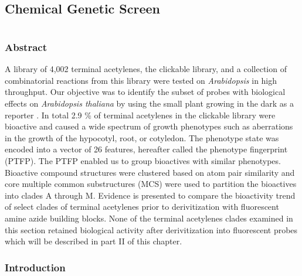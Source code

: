\chapter{Chemical Genetic Screen}

\part{}

\section{Abstract}

A library of 4,002 terminal acetylenes, the clickable library, and a collection of combinatorial reactions from this library were tested on {\it Arabidopsis} in high throughput. Our objective was to identify the subset of probes with biological effects on {\it Arabidopsis thaliana} by using the small plant growing in the dark as a reporter \cite{pennacchio2005arabidopsis,tojo2006simple}. In total 2.9 {\%} of terminal acetylenes in the clickable library were bioactive and caused a wide spectrum of growth phenotypes such as aberrations in the growth of the hypocotyl, root, or cotyledon. The phenotype state was encoded into a vector of 26 features, hereafter called the phenotype fingerprint (PTFP). The PTFP enabled us to group bioactives with similar phenotypes. Bioactive compound structures were clustered based on atom pair similarity and core multiple common substructures (MCS) were used to partition the bioactives into clades A through M. Evidence is presented to compare the bioactivity trend of select clades of terminal acetylenes prior to derivitization with fluorescent amine azide building blocks. None of the terminal acetylenes clades examined in this section retained biological activity after derivitization into fluorescent probes which will be described in part II of this chapter.


\section{Introduction}

